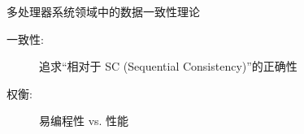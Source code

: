 \begin{frame}{多处理器系统领域中的数据一致性理论}
  \vspace{0.20cm}

  \begin{description}
	\item[一致性:] 追求``相对于 SC {\small (Sequential Consistency)}''的正确性~\footnotemark[1]~ 
	\item[权衡:] 易编程性 vs. 性能
  \end{description}


\end{frame}
